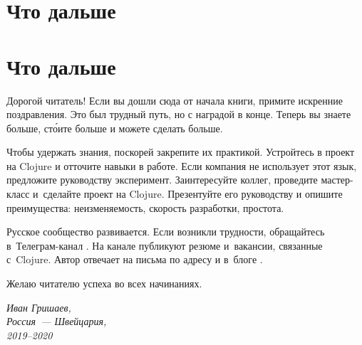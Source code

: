 
\ifx\MODE\PRINT
\chapter{Что дальше}
\else
\chapter*{Что дальше}
\fi

Дорогой читатель! Если вы дошли сюда от начала книги, примите искренние
поздравления. Это был трудный путь, но с наградой в конце. Теперь вы знаете
больше, ст\'{о}ите больше и можете сделать больше.

Чтобы удержать знания, поскорей закрепите их практикой. Устройтесь в проект на
Clojure и отточите навыки в работе. Если компания не использует этот язык,
предложите руководству эксперимент. Заинтересуйте коллег, проведите мастер-класс
и~сделайте проект на Clojure. Презентуйте его руководству и опишите
преимущества: неизменяемость, скорость разработки, простота.

Русское сообщество развивается. Если возникли трудности, обращайтесь
в~Телеграм-канал . На канале  публикуют
резюме и~вакансии, связанные с~Clojure. Автор отвечает на письма по адресу
\EMAILLINK\xspace и в~блоге \SITELINK.

Желаю читателю успеха во всех начинаниях.

\vspace{1em}

\noindent

\hspace{\fill}\parbox{4cm}{\textit{Иван Гришаев,\\Россия~--- Швейцария,\\2019--2020}}
